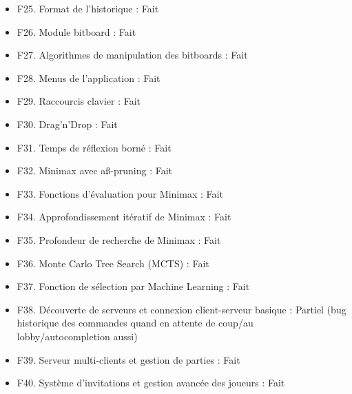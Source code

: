 \documentclass[a4paper]{article}
\begin{document}
\begin{itemize}
    \item F25. Format de l'historique : Fait
    \item F26. Module bitboard : Fait
    \item F27. Algorithmes de manipulation des bitboards : Fait
    \item F28. Menus de l'application : Fait
    \item F29. Raccourcis clavier : Fait
    \item F30. Drag'n'Drop : Fait
    \item F31. Temps de réflexion borné : Fait
    \item F32. Minimax avec aß-pruning : Fait
    \item F33. Fonctions d'évaluation pour Minimax : Fait
    \item F34. Approfondissement itératif de Minimax : Fait
    \item F35. Profondeur de recherche de Minimax : Fait
    \item F36. Monte Carlo Tree Search (MCTS) : Fait
    \item F37. Fonction de sélection par Machine Learning : Fait
    \item F38. Découverte de serveurs et connexion client-serveur basique : Partiel (bug historique des commandes quand en attente de coup/au lobby/autocompletion aussi)
    \item F39. Serveur multi-clients et gestion de parties : Fait
    \item F40. Système d'invitations et gestion avancée des joueurs : Fait
\end{itemize}
\end{document}
